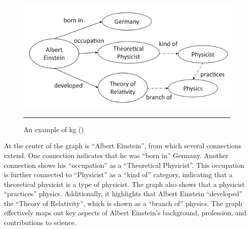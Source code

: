 \begin{figure}[htbp]
    \centering
 \includegraphics[width=.8\textwidth]{figures/literature-review/kg-example-albert-einstein.png}
     \rule{35em}{0.5pt}
    \caption{An example of \acrlong{kg} (\textcite{Chaudhri2022})} 
 \label{fig:kg-example-albert-einstein}
\end{figure}

At the center of the graph is ``Albert Einstein'', from which several connections extend.
One connection indicates that he was ``born in'' Germany.
Another connection shows his ``occupation'' as a ``Theoretical Physicist''.
This occupation is further connected to ``Physicist'' as a ``kind of'' category, indicating that a theoretical physicist is a type of physicist.
The graph also shows that a physicist ``practices'' physics.
Additionally, it highlights that Albert Einstein ``developed'' the ``Theory of Relativity'', which is shown as a ``branch of'' physics.
The graph effectively maps out key aspects of Albert Einstein's background, profession, and contributions to science.

